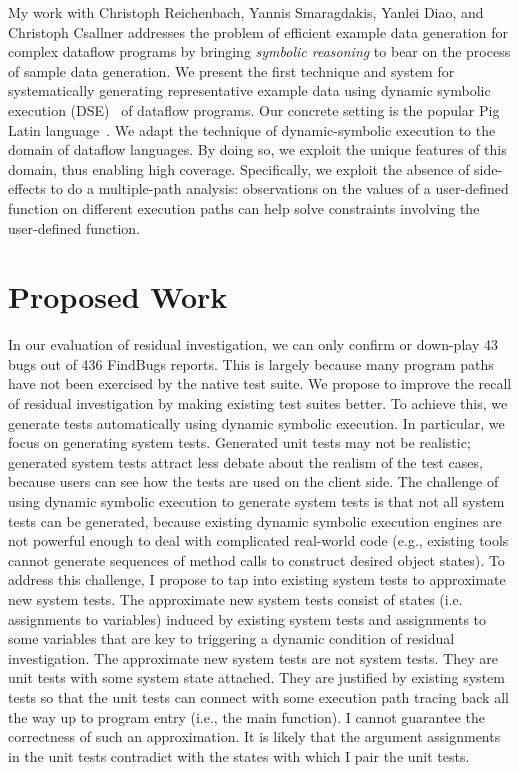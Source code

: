 \documentclass[proposal]{umthesis} %
\begin{document}
My work \cite{6693083} with Christoph Reichenbach, Yannis Smaragdakis, Yanlei Diao, and Christoph Csallner addresses the problem of efficient example data
generation for complex dataflow programs by bringing {\em
  symbolic reasoning} to bear on the process of sample data
generation.  We present the first technique and system for
systematically generating representative example data using dynamic
symbolic execution (DSE)~\cite{godefroid05dart,cadar05execution,tillmann:08} of dataflow programs.  Our
concrete setting is the popular Pig Latin
language~\cite{Olston:2008:PLN:1376616.1376726}.  We adapt the technique of dynamic-symbolic execution to the domain of dataflow languages. By doing so, we exploit the unique features of this domain, thus enabling high coverage. Specifically,
  we exploit the absence of side-effects to do a
  multiple-path analysis: observations on the values of a user-defined
  function on different execution paths can help solve constraints
  involving the user-defined function.

  
\chapter{Proposed Work}
\label{chp:proposed}

In our evaluation of residual investigation, we can only confirm or down-play 43 bugs out of 436 FindBugs reports. This is largely because many program paths have not been exercised by the native test suite. We propose to improve the recall of residual investigation by making existing test suites better. To achieve this, we generate tests automatically using dynamic symbolic execution.  In particular, we focus on generating system tests. Generated unit tests may not be realistic; generated system tests attract less debate about the realism of the test cases, because users can see how the tests are used on the client side.  The challenge of using dynamic symbolic execution to generate system tests is that not all system tests can be generated, because existing dynamic symbolic execution engines are not powerful enough to deal with complicated real-world code (e.g., existing tools cannot generate sequences of method calls to construct desired object states)\cite{Xiao:2011:PIP:1985793.1985876}.  To address this challenge, I propose to tap into existing system tests to approximate new system tests. The approximate new system tests consist of  states (i.e. assignments to variables) induced by existing system tests and assignments to some variables that are key to triggering a dynamic condition of residual investigation.  The approximate new system tests are not system tests.  They are unit tests with some system state attached.  They are justified by existing system tests so that the unit tests can connect with some execution path tracing back all the way up to program entry (i.e., the main function).  I cannot guarantee the correctness of such an approximation. It is likely that the argument assignments in the unit tests contradict with the states with which I pair the unit tests.  
\end{document}
